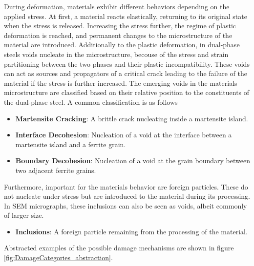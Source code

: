 During deformation, materials exhibit different behaviors depending on the applied stress. At first, a material reacts elastically, returning to its original state when the stress is released. Increasing the stress further, the regime of plastic deformation is reached, and permanent changes to the microstructure of the material are introduced. Additionally to the plastic deformation, in dual-phase steels voids nucleate in the microstructure, becouse of the stress and strain partitioning between the two phases and their plastic incompatibility. These voids can act as sources and propagators of a critical crack leading to the failure of the material if the stress is further increased. The emerging voids in the materials microstructure are classified based on their relative position to the constituents of the dual-phase steel. A common classification is as follows
\begin{itemize}[label={}]
\item \textbf{Martensite Cracking}: A brittle crack nucleating inside a martensite island.
\item \textbf{Interface Decohesion}: Nucleation of a void at the interface between a martensite island and a ferrite grain.
\item \textbf{Boundary Decohesion}: Nucleation of a void at the grain boundary between two adjacent ferrite grains.
\end{itemize}
Furthermore, important for the materials behavior are foreign particles. These do not nucleate under stress but are introduced to the material during its processing. In SEM micrographs, these inclusions can also be seen as voids, albeit commonly of larger size.
\begin{itemize}[label={}]
\item \textbf{Inclusions}: A foreign particle remaining from the processing of the material. 
\end{itemize}
Abstracted examples of the possible damage mechanisms are shown in figure \ref{fig:DamageCategories_abstraction}. \\



